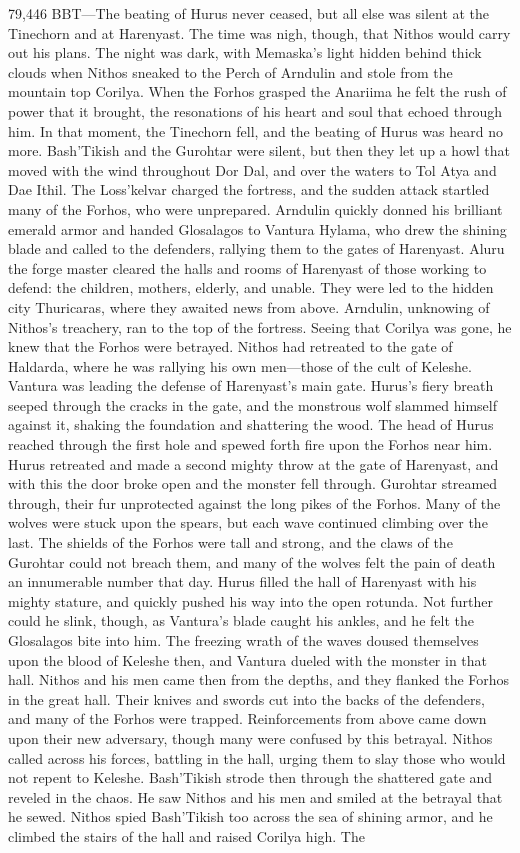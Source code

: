 \documentclass[smalldemyvopaper,11pt,twoside,onecolumn,openright,extrafontsizes]{memoir}
\begin{document}
79,446 BBT—The beating of Hurus never ceased, but all else was silent at the Tinechorn and at Harenyast. The time was nigh, though, that Nithos would carry out his plans. The night was dark, with Memaska’s light hidden behind thick clouds when Nithos sneaked to the Perch of Arndulin and stole from the mountain top Corilya. When the Forhos grasped the Anariima he felt the rush of power that it brought, the resonations of his heart and soul that echoed through him. In that moment, the Tinechorn fell, and the beating of Hurus was heard no more. Bash’Tikish and the Gurohtar were silent, but then they let up a howl that moved with the wind throughout Dor Dal, and over the waters to Tol Atya and Dae Ithil. The Loss’kelvar charged the fortress, and the sudden attack startled many of the Forhos, who were unprepared. Arndulin quickly donned his brilliant emerald armor and handed Glosalagos to Vantura Hylama, who drew the shining blade and called to the defenders, rallying them to the gates of Harenyast. Aluru the forge master cleared the halls and rooms of Harenyast of those working to defend: the children, mothers, elderly, and unable. They were led to the hidden city Thuricaras, where they awaited news from above. Arndulin, unknowing of Nithos’s treachery, ran to the top of the fortress. Seeing that Corilya was gone, he knew that the Forhos were betrayed. Nithos had retreated to the gate of Haldarda, where he was rallying his own men—those of the cult of Keleshe. Vantura was leading the defense of Harenyast’s main gate. Hurus’s fiery breath seeped through the cracks in the gate, and the monstrous wolf slammed himself against it, shaking the foundation and shattering the wood. The head of Hurus reached through the first hole and spewed forth fire upon the Forhos near him. Hurus retreated and made a second mighty throw at the gate of Harenyast, and with this the door broke open and the monster fell through. Gurohtar streamed through, their fur unprotected against the long pikes of the Forhos. Many of the wolves were stuck upon the spears, but each wave continued climbing over the last. The shields of the Forhos were tall and strong, and the claws of the Gurohtar could not breach them, and many of the wolves felt the pain of death an innumerable number that day. Hurus filled the hall of Harenyast with his mighty stature, and quickly pushed his way into the open rotunda. Not further could he slink, though, as Vantura’s blade caught his ankles, and he felt the Glosalagos bite into him. The freezing wrath of the waves doused themselves upon the blood of Keleshe then, and Vantura dueled with the monster in that hall. Nithos and his men came then from the depths, and they flanked the Forhos in the great hall. Their knives and swords cut into the backs of the defenders, and many of the Forhos were trapped. Reinforcements from above came down upon their new adversary, though many were confused by this betrayal. Nithos called across his forces, battling in the hall, urging them to slay those who would not repent to Keleshe. Bash’Tikish strode then through the shattered gate and reveled in the chaos. He saw Nithos and his men and smiled at the betrayal that he sewed. Nithos spied Bash’Tikish too across the sea of shining armor, and he climbed the stairs of the hall and raised Corilya high. The 
\end{document}
